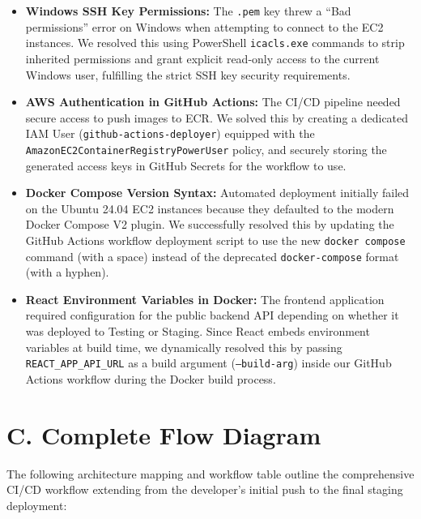 \documentclass[12pt,letterpaper]{article}
\begin{document}
\begin{itemize}
    \item \textbf{Windows SSH Key Permissions:} 
    The \texttt{.pem} key threw a ``Bad permissions'' error on Windows when attempting to connect to the EC2 instances. We resolved this using PowerShell \texttt{icacls.exe} commands to strip inherited permissions and grant explicit read-only access to the current Windows user, fulfilling the strict SSH key security requirements.

    \item \textbf{AWS Authentication in GitHub Actions:} 
    The CI/CD pipeline needed secure access to push images to ECR. We solved this by creating a dedicated IAM User (\texttt{github-actions-deployer}) equipped with the \texttt{AmazonEC2ContainerRegistryPowerUser} policy, and securely storing the generated access keys in GitHub Secrets for the workflow to use.

    \item \textbf{Docker Compose Version Syntax:} 
    Automated deployment initially failed on the Ubuntu 24.04 EC2 instances because they defaulted to the modern Docker Compose V2 plugin. We successfully resolved this by updating the GitHub Actions workflow deployment script to use the new \texttt{docker compose} command (with a space) instead of the deprecated \texttt{docker-compose} format (with a hyphen).

    \item \textbf{React Environment Variables in Docker:} 
    The frontend application required configuration for the public backend API depending on whether it was deployed to Testing or Staging. Since React embeds environment variables at build time, we dynamically resolved this by passing \texttt{REACT\_APP\_API\_URL} as a build argument (\texttt{--build-arg}) inside our GitHub Actions workflow during the Docker build process.
\end{itemize}

\section*{C. Complete Flow Diagram}
The following architecture mapping and workflow table outline the comprehensive CI/CD workflow extending from the developer's initial push to the final staging deployment:
\end{document}
